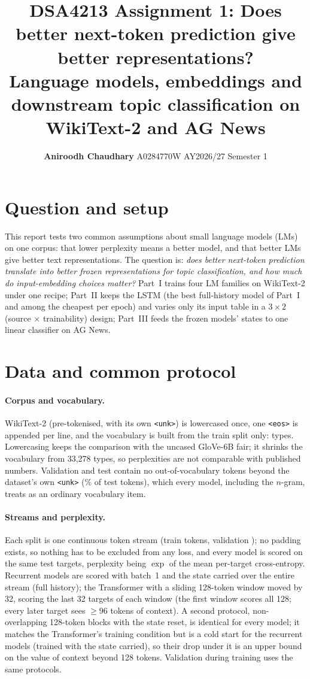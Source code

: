 \documentclass[10pt,a4paper]{article}
\title{\vspace{-1.2cm}DSA4213 Assignment 1: Does better next-token prediction give better representations?\\
\large Language models, embeddings and downstream topic classification on WikiText-2 and AG News}
\author{\textbf{Aniroodh Chaudhary} \quad A0284770W \quad AY2026/27 Semester 1}
\date{\vspace{-0.4cm}}
\begin{document}
\maketitle
\vspace{-0.8cm}

\section{Question and setup}
This report tests two common assumptions about small language models (LMs) on one corpus: that lower perplexity means a better model, and that better LMs give better text representations. The question is: \emph{does better next-token prediction translate into better frozen representations for topic classification, and how much do input-embedding choices matter?} Part~I trains four LM families on WikiText-2 under one recipe; Part~II keeps the LSTM (the best full-history model of Part~I and among the cheapest per epoch) and varies only its input table in a $3\times2$ (source $\times$ trainability) design; Part~III feeds the frozen models' states to one linear classifier on AG News.

\section{Data and common protocol}
\paragraph{Corpus and vocabulary.} WikiText-2 \citep{merity2017pointer} (pre-tokenised, with its own \texttt{<unk>}) is lowercased once, one \texttt{<eos>} is appended per line, and the vocabulary is built from the train split only: \nVocab{} types. Lowercasing keeps the comparison with the uncased GloVe-6B fair; it shrinks the vocabulary from 33,278 types, so perplexities are not comparable with published numbers. Validation and test contain no out-of-vocabulary tokens beyond the dataset's own \texttt{<unk>} (\unkFracTest\% of test tokens), which every model, including the $n$-gram, treats as an ordinary vocabulary item.

\paragraph{Streams and perplexity.} Each split is one continuous token stream (train \nTrainTok{} tokens, validation \nValTok); no padding exists, so nothing has to be excluded from any loss, and every model is scored on the same \nTestTargets{} test targets, perplexity being $\exp$ of the mean per-target cross-entropy. Recurrent models are scored with batch~1 and the state carried over the entire stream (full history); the Transformer with a sliding 128-token window moved by 32, scoring the last 32 targets of each window (the first window scores all 128; every later target sees $\ge$96 tokens of context). A second protocol, non-overlapping 128-token blocks with the state reset, is identical for every model; it matches the Transformer's training condition but is a cold start for the recurrent models (trained with the state carried), so their drop under it is an upper bound on the value of context beyond 128 tokens. Validation during training uses the same protocols.
\end{document}
